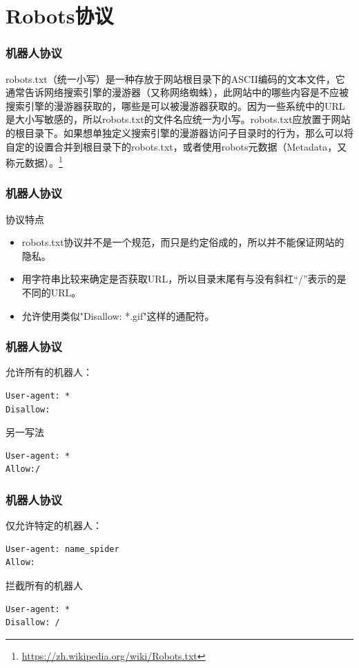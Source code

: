 \documentclass{beamer}
\begin{document}
\section{Robots协议} %
\label{sec:Robots协议}
\begin{frame}
  \frametitle{机器人协议}
	robots.txt（统一小写）是一种存放于网站根目录下的ASCII编码的文本文件，它通常告诉网络搜索引擎的漫游器（又称网络蜘蛛），此网站中的哪些内容是不应被搜索引擎的漫游器获取的，哪些是可以被漫游器获取的。因为一些系统中的URL是大小写敏感的，所以robots.txt的文件名应统一为小写。robots.txt应放置于网站的根目录下。如果想单独定义搜索引擎的漫游器访问子目录时的行为，那么可以将自定的设置合并到根目录下的robots.txt，或者使用robots元数据（Metadata，又称元数据）。\footnote{\url{https://zh.wikipedia.org/wiki/Robots.txt}}
\end{frame}

\begin{frame}
  \frametitle{机器人协议}
	\begin{block}
		{协议特点}
		\begin{itemize}
			\item robots.txt协议并不是一个规范，而只是约定俗成的，所以并不能保证网站的隐私。
			\item 用字符串比较来确定是否获取URL，所以目录末尾有与没有斜杠“/”表示的是不同的URL。
			\item 允许使用类似"Disallow: *.gif"这样的通配符。
		\end{itemize}
	\end{block}
\end{frame}

\begin{frame}[t,fragile]
  \frametitle{机器人协议}
	\begin{block}
		{允许所有的机器人：}
\begin{verbatim}
User-agent: *
Disallow:
\end{verbatim}
	\end{block}
	\begin{block}
		{另一写法}
\begin{verbatim}
User-agent: *
Allow:/
\end{verbatim}
	\end{block}
\end{frame}

\begin{frame}[t,fragile]
  \frametitle{机器人协议}
	\begin{block}
		{仅允许特定的机器人：}
\begin{verbatim}
User-agent: name_spider
Allow:
\end{verbatim}
	\end{block}
	\begin{block}
		{拦截所有的机器人}
\begin{verbatim}
User-agent: *
Disallow: /
\end{verbatim}
	\end{block}
\end{frame}
\end{document}
